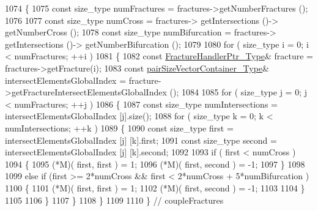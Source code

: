 \begin{DoxyCode}
1074 \{
1075     \textcolor{keyword}{const} size\_type numFractures = fractures->getNumberFractures ();
1076     
1077     \textcolor{keyword}{const} size\_type numCross = fractures-> getIntersections ()-> getNumberCross ();
1078     \textcolor{keyword}{const} size\_type numBifurcation = fractures-> getIntersections ()-> getNumberBifurcation ();
1079 
1080     \textcolor{keywordflow}{for} ( size\_type i = 0; i < numFractures; ++i )
1081     \{
1082         \textcolor{keyword}{const} \hyperlink{FractureHandler_8h_af23fb7a30aaff864bd42587af4f1e78a}{FractureHandlerPtr\_Type}& fracture = fractures->getFracture(i);
1083         \textcolor{keyword}{const} \hyperlink{Core_8h_a9bc476e433f99b82a9c2b8560735c7b5}{pairSizeVectorContainer\_Type}& intersectElementsGlobalIndex = 
      fracture->getFractureIntersectElementsGlobalIndex ();
1084 
1085         \textcolor{keywordflow}{for} ( size\_type j = 0; j < numFractures; ++j )
1086         \{
1087             \textcolor{keyword}{const} size\_type numIntersections = intersectElementsGlobalIndex [j].size();
1088             \textcolor{keywordflow}{for} ( size\_type k = 0; k < numIntersections; ++k )
1089             \{
1090                 \textcolor{keyword}{const} size\_type first = intersectElementsGlobalIndex [j] [k].first;
1091                 \textcolor{keyword}{const} size\_type second = intersectElementsGlobalIndex [j] [k].second;
1092                 
1093                 \textcolor{keywordflow}{if} ( first < numCross )
1094                 \{
1095                     (*M)( first, first ) = 1;
1096                     (*M)( first, second ) = -1;
1097                 \}
1098                 
1099                 \textcolor{keywordflow}{else} \textcolor{keywordflow}{if} (first >= 2*numCross && first < 2*numCross + 5*numBifurcation )
1100                 \{
1101                     (*M)( first, first ) = 1;
1102                     (*M)( first, second ) = -1;
1103                     
1104                 \}
1105                 
1106             \}
1107         \}
1108     \}
1109 
1110 \} \textcolor{comment}{// coupleFractures}
\end{DoxyCode}
